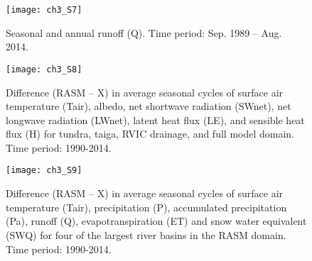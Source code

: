 \begin{figure}
    \centering
    \texttt{[image: ch3\_S7]}
    \caption{Seasonal and annual runoff (Q).
    Time period: Sep. 1989 – Aug. 2014.}
\end{figure}

\begin{figure}
    \centering
    \texttt{[image: ch3\_S8]}
    \caption{Difference (RASM – X) in average seasonal cycles of surface air temperature (Tair), albedo, net shortwave radiation (SWnet), net longwave radiation (LWnet), latent heat flux (LE), and sensible heat flux (H) for tundra, taiga, RVIC drainage, and full model domain.
    Time period: 1990-2014.}
\end{figure}

\begin{figure}
    \centering
    \texttt{[image: ch3\_S9]}
    \caption{Difference (RASM – X) in average seasonal cycles of surface air temperature (Tair), precipitation (P), accumulated precipitation (Pa), runoff (Q), evapotranspiration (ET) and snow water equivalent (SWQ) for four of the largest river basins in the RASM domain.
    Time period: 1990-2014.}
\end{figure}


